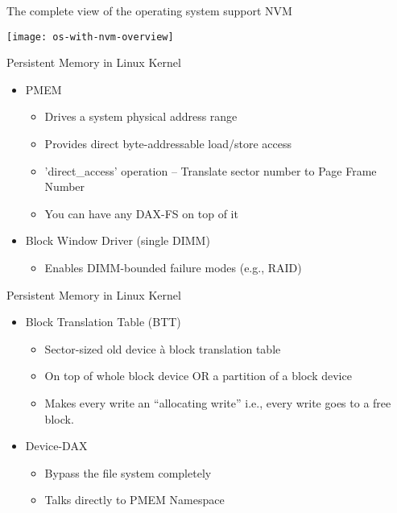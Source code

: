 \begin{frame}[plain]
    
    
    
    The complete view of the operating system support NVM
    
    
    \texttt{[image: os-with-nvm-overview]}
    
    
    
    
\end{frame}

\begin{frame}
    
    Persistent Memory in Linux Kernel
    
    \begin{itemize}
        \item PMEM 
        \begin{itemize}
            \item Drives a system physical address range
            \item  Provides direct byte-addressable load/store access 
            \item 'direct\_access’ operation – Translate sector number to Page Frame Number
            \item You can have any DAX-FS on top of it
        \end{itemize}
        \item  Block Window Driver (single DIMM)
        \begin{itemize}
            \item Enables DIMM-bounded failure modes (e.g., RAID)
        \end{itemize}        
    \end{itemize}   
    
    
\end{frame}
\begin{frame}
    
    Persistent Memory in Linux Kernel
    
    \begin{itemize}
        \item Block Translation Table (BTT) 
        \begin{itemize}
            \item Sector-sized old device à block translation table 
            \item  On top of whole block device OR a partition of a block device 
            \item Makes every write an “allocating write” i.e., every write goes to a free block. 
        \end{itemize}
        \item Device-DAX
        \begin{itemize}
            \item  Bypass the file system completely
            \item Talks directly to PMEM Namespace
        \end{itemize}    
    \end{itemize}   
    
    
\end{frame}
